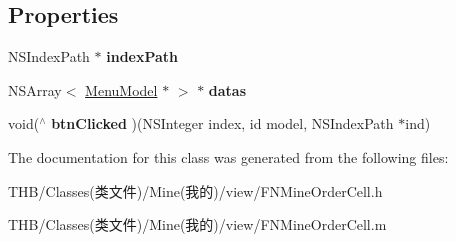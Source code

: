 \subsection*{Properties}
\begin{DoxyCompactItemize}
\item 
\mbox{\label{interface_f_n_mine_order_cell_a5a1bc3e210d75b442c11b19bb52b17db}} 
N\+S\+Index\+Path $\ast$ {\bfseries index\+Path}
\item 
\mbox{\label{interface_f_n_mine_order_cell_a28cc123bea07bea8ba1661a4a2537a27}} 
N\+S\+Array$<$ \mbox{\hyperlink{interface_menu_model}{Menu\+Model}} $\ast$ $>$ $\ast$ {\bfseries datas}
\item 
\mbox{\label{interface_f_n_mine_order_cell_a40140daa99d165714c2833917d2d9a14}} 
void($^\wedge$ {\bfseries btn\+Clicked} )(N\+S\+Integer index, id model, N\+S\+Index\+Path $\ast$ind)
\end{DoxyCompactItemize}


The documentation for this class was generated from the following files\+:\begin{DoxyCompactItemize}
\item 
T\+H\+B/\+Classes(类文件)/\+Mine(我的)/view/F\+N\+Mine\+Order\+Cell.\+h\item 
T\+H\+B/\+Classes(类文件)/\+Mine(我的)/view/F\+N\+Mine\+Order\+Cell.\+m\end{DoxyCompactItemize}
